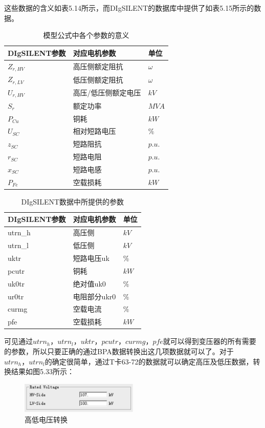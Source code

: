 这些数据的含义如表5.14所示，而DIgSILENT的数据库中提供了如表5.15所示的数据。

\begin{table}[h]
\centering
\begin{tabular}{lll}
\toprule
DIgSILENT参数 & 对应电机参数 & 单位\\
 \midrule
$Z_{r, HV}$ & 高压侧额定阻抗 & $\omega$\\
$Z_{r, LV}$ & 低压侧额定阻抗 & $\omega$\\
$U_{r, HV}$ & 高压/低压侧额定电压 & $kV$\\
$S_r$ & 额定功率 & $MVA$\\
$P_{Cu}$ & 铜耗 & $kW$ \\
$U_{SC}$ & 相对短路电压 & $\%$ \\
$z_{SC}$ & 短路阻抗 & $p.u.$ \\
$r_{SC}$ & 短路电阻 & $p.u.$ \\
$x_{SC}$ & 短路电感 & $p.u.$\\
$P_{Fe}$ & 空载损耗 & $kW$\\
\bottomrule
\end{tabular}
\caption{模型公式中各个参数的意义}
\end{table}

\begin{table}[h]
\centering
\begin{tabular}{lll}
\toprule
DIgSILENT参数 & 对应电机参数 & 单位\\
 \midrule
utrn\_h & 高压侧 & $kV$\\
utrn\_l & 低压侧 & $kV$\\
uktr & 短路电压uk & $\%$\\
pcutr & 铜耗 & $kW$\\
uk0tr & 绝对值uk0 & $\%$ \\
ur0tr & 电阻部分ukr0& $\%$ \\
curmg & 空载电流 & $\%$ \\
pfe & 空载损耗 & $kW$ \\
\bottomrule
\end{tabular}
\caption{DIgSILENT数据中所提供的参数}
\end{table}

可见通过$utrn_h，utrn_l，uktr，pcutr，curmg，pfe$就可以得到变压器的所有需要的参数，所以只要正确的通过BPA数据转换出这几项数据就可以了。对于$utrn_h，utrn_l$的确定很简单，通过T卡63-72的数据就可以确定高压及低压数据，转换结果如图5.33所示：

\begin{figure}[H]
\centering
\includegraphics[width=0.5\textwidth]{images/Paper_Fig_49.png}
\setcaptionwidth{\linewidth}
\caption{高低电压转换}
\end{figure}

